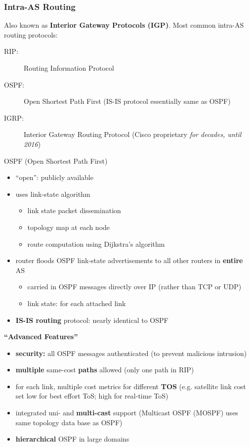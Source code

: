 \subsubsection{Intra-AS Routing}
Also known as \textbf{Interior Gateway Protocols (IGP)}. Most common intra-AS routing protocols:
\begin{description}
	\item[RIP:] Routing Information Protocol
	\item[OSPF:] Open Shortest Path First (IS-IS protocol essentially same as OSPF)
	\item[IGRP:] Interior Gateway Routing Protocol (Cisco proprietary \textit{for decades, until 2016})
\end{description}
\begin{note}{OSPF (Open Shortest Path First)}
	\begin{itemize}
		\item ``open'': publicly available
		\item uses link-state algorithm
		\begin{itemize}
			\item link state packet dissemination
			\item topology map at each node
			\item route computation using Dijkstra's algorithm
		\end{itemize}
		\item router floods OSPF link-state advertisements to all other routers in \textbf{entire} AS
		\begin{itemize}
			\item carried in OSPF messages directly over IP (rather than TCP or UDP)
			\item link state: for each attached link
		\end{itemize}
		\item \textbf{IS-IS routing} protocol: nearly identical to OSPF
	\end{itemize}\vspace{1em}
	\textbf{``Advanced Features''}
	\begin{itemize}
		\item \textbf{security:} all OSPF messages authenticated (to prevent malicious intrusion)
		\item \textbf{multiple} same-cost \textbf{paths} allowed (only one path in RIP)
		\item for each link, multiple cost metrics for different \textbf{TOS} (e.g. satellite link cost set low for best effort ToS; high for real-time ToS)
		\item integrated uni- and \textbf{multi-cast} support (Multicast OSPF (MOSPF) uses same topology data base as OSPF)
		\item \textbf{hierarchical} OSPF in large domains
	\end{itemize}
\end{note}
